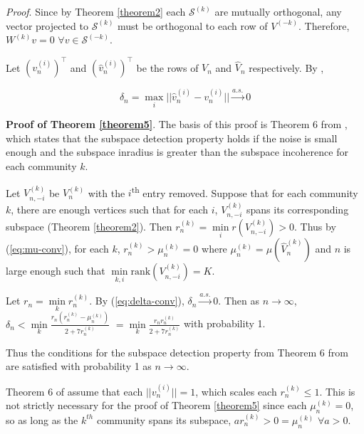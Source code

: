 \documentclass[12pt]{article}
\begin{document}
\emph{Proof}. Since by Theorem \ref{theorem2} each \(\mathcal{S}^{(k)}\)
are mutually orthogonal, any vector projected to \(\mathcal{S}^{(k)}\)
must be orthogonal to each row of \(V^{(-k)}\). Therefore,
\(W^{(k)} v = 0\) \(\forall v \in \mathcal{S}^{(-k)}\).

\begin{lemma}
\label{lemma3}
Let $(v_n^{(i)})^\top$ and $(\hat{v}_n^{(i)})^\top$ be the rows of $V_n$ and
$\hat{V}_n$ respectively. By \citeauthor{rubindelanchy2017statistical},

\begin{equation} \label{eq:delta-conv}
\delta_n = \max_i ||\hat{v}_n^{(i)} - v_n^{(i)}|| \stackrel{a.s.}{\to} 0
\end{equation}
\end{lemma}

\textbf{Proof of Theorem \ref{theorem5}}. The basis of this proof is
Theorem 6 from \citeauthor{jmlr-v28-wang13}, which states that the
subspace detection property holds if the noise is small enough and the
subspace inradius is greater than the subspace incoherence for each
community \(k\).

Let \(V_{n, -i}^{(k)}\) be \(V_n^{(k)}\) with the
\(i\)\textsuperscript{th} entry removed. Suppose that for each community
\(k\), there are enough vertices such that for each \(i\),
\(V_{n, -i}^{(k)}\) spans its corresponding subspace (Theorem
\ref{theorem2}). Then
\(r_n^{(k)} = \min\limits_i r(V_{n, -i}^{(k)}) > 0\). Thus by
(\ref{eq:mu-conv}), for each \(k\), \(r_n^{(k)} > \mu_n^{(k)} = 0\)
where \(\mu_n^{(k)} = \mu(\hat{V}_n^{(k)})\) and \(n\) is large enough
such that \(\min\limits_{k, i} \text{rank}(V_{n, -i}^{(k)}) = K\).

Let \(r_n = \min\limits_k r_n^{(k)}\). By (\ref{eq:delta-conv}),
\(\delta_n \stackrel{a.s.}{\to} 0\). Then as \(n\to \infty\),
\(\delta_n < \min\limits_k \frac{r_n (r_n^{(k)} - \mu_n^{(k)})}{2 + 7 r_n^{(k)}}\)
\(= \min\limits_k \frac{r_n r_n^{(k)}}{2 + 7 r_n^{(k)}}\) with
probability 1.

Thus the conditions for the subspace detection property from Theorem 6
from \citeauthor{jmlr-v28-wang13} are satisfied with probability 1 as
\(n \to \infty\).

\begin{remark}
Theorem 6 of \citeauthor{jmlr-v28-wang13} assume that each $||v_n^{(i)}|| = 1$,
which scales each $r_n^{(k)} \leq 1$. This is not strictly necessary for
the proof of Theorem \ref{theorem5} since each $\mu_n^{(k)} = 0$, so as long
as the $k^{th}$ community spans its subspace, $a r_n^{(k)} > 0 = \mu_n^{(k)}$
$\forall a > 0$.
\end{remark}
\end{document}
